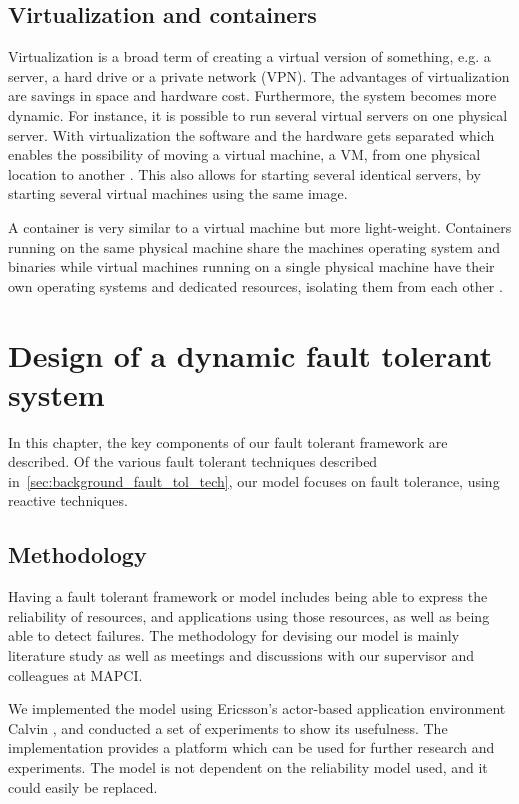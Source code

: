 \documentclass{cslthse-msc}
\begin{document}
\section{Virtualization and containers} \label{sec:background_virtualization}
Virtualization is a broad term of creating a virtual version of something, e.g. a server, a hard drive or a private network (VPN). The advantages of virtualization are savings in space and hardware cost. Furthermore, the system becomes more dynamic. For instance, it is possible to run several virtual servers on one physical server. With virtualization the software and the hardware gets separated which enables the possibility of moving a virtual machine, a VM, from one physical location to another \cite{virtualMachine}. This also allows for starting several identical servers, by starting several virtual machines using the same image.

A container is very similar to a virtual machine but more light-weight. Containers running on the same physical machine share the machines operating system and binaries while virtual machines running on a single physical machine have their own operating systems and dedicated resources, isolating them from each other \cite{vm_vs_container}. 

\chapter{Design of a dynamic fault tolerant system} \label{ch:design}
In this chapter, the key components of our fault tolerant framework are described. Of the various fault tolerant techniques described in~\cref{sec:background_fault_tol_tech}, our model focuses on fault tolerance, using reactive techniques.

\section{Methodology} \label{sec:design_methodology}
Having a fault tolerant framework or model includes being able to express the reliability of resources, and applications using those resources, as well as being able to detect failures. The methodology for devising our model is mainly literature study as well as meetings and discussions with our supervisor and colleagues at MAPCI.

We implemented the model using Ericsson's actor-based application environment Calvin \cite{calvin}, and conducted a set of experiments to show its usefulness. The implementation provides a platform which can be used for further research and experiments. The model is not dependent on the reliability model used, and it could easily be replaced.
\end{document}
